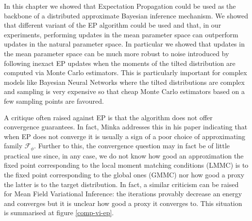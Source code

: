 In this chapter we showed that Expectation Propagation could be used as the backbone of a distributed approximate Bayesian inference mechanism. 
We showed that different variant of the EP algorithm could be used and that, in our experiments, performing updates in the mean parameter space can outperform updates in the natural parameter space. 
In particular we showed that updates in the mean parameter space can be much more robust to noise introduced by following inexact EP updates when the moments of the tilted distribution are computed via Monte Carlo estimators. This is particularly important for complex models like Bayesian Neural Networks where the tilted distributions are complex and sampling is very expensive so that cheap Monte Carlo estimators based on a few sampling points are favoured. 

A critique often raised against EP is that the algorithm does not offer convergence guarantees. In fact, Minka addresses this in his paper \citep{minka01} indicating that when EP does not converge it is usually a sign of a poor choice of approximating family $\mathcal F_{\phi}$. 
Further to this, the convergence question may in fact be of little practical use since, in any case, we do not know how good an approximation the fixed point corresponding to the local moment matching conditions (LMMC) is to the fixed point corresponding to the global ones (GMMC) nor how good a proxy the latter is to the target distribution. In fact, a similar criticism can be raised for Mean Field Variational Inference: the iterations provably decrease an energy and converges but it is unclear how good a proxy it converges to. This situation is summarised at figure \ref{comp-vi-ep}.

